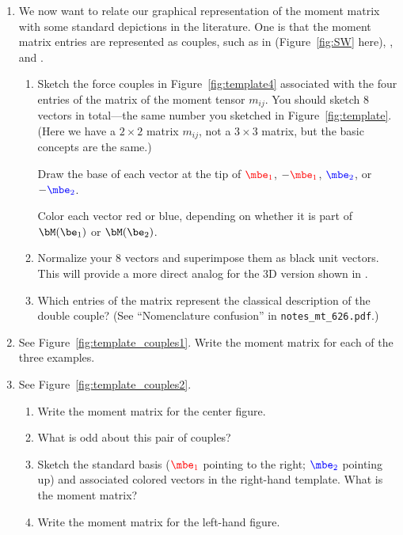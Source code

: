 \documentclass[11pt,titlepage,fleqn]{article}
\newcommand{\mtfile}{\texttt{notes\_mt\_626.pdf}}
\newcommand{\eone}{\textcolor{red}{\mbe_1}}
\newcommand{\etwo}{\textcolor{blue}{\mbe_2}}
\begin{document}
\begin{enumerate}
\item 
\label{prob:matrix}
We now want to relate our graphical representation of the moment matrix with some standard depictions in the literature. One is that the moment matrix entries are represented as couples, such as in \citet[][Figure 4.4-4]{SteinWysession} (Figure~\ref{fig:SW} here), \citet[][Figure~9.2]{ShearerE2}, and \citet[][Figure 3.7]{AkiRichardsE2}.
%
\begin{enumerate}
\item Sketch the force couples in Figure~\ref{fig:template4} associated with the four entries of the matrix of the moment tensor $m_{ij}$. You should sketch 8 vectors in total---the same number you sketched in Figure~\ref{fig:template}.
(Here we have a $2 \times 2$ matrix $m_{ij}$, not a $3 \times 3$ matrix, but the basic concepts are the same.)

Draw the base of each vector at the tip of $\eone$, $-\eone$, $\etwo$, or $-\etwo$.

Color each vector red or blue, depending on whether it is part of \textcolor{red}{$\bM(\be_1)$} or \textcolor{blue}{$\bM(\be_2)$}.

\item Normalize your 8 vectors and superimpose them as black unit vectors. This will provide a more direct analog for the 3D version shown in .

\item Which entries of the matrix represent the classical description of the double couple?
(See ``Nomenclature confusion'' in \mtfile.)
\end{enumerate}


\item 
\label{prob:couples1}
See Figure~\ref{fig:template_couples1}.
Write the moment matrix for each of the three examples.


\item
\label{prob:couples2}
See Figure~\ref{fig:template_couples2}.
%
\begin{enumerate}
\item Write the moment matrix for the center figure.
\item What is odd about this pair of couples?
\item Sketch the standard basis ($\eone$ pointing to the right; $\etwo$ pointing up) and associated colored vectors in the right-hand template. What is the moment matrix?
\item Write the moment matrix for the left-hand figure.
\end{enumerate}


\end{enumerate}
\end{document}
